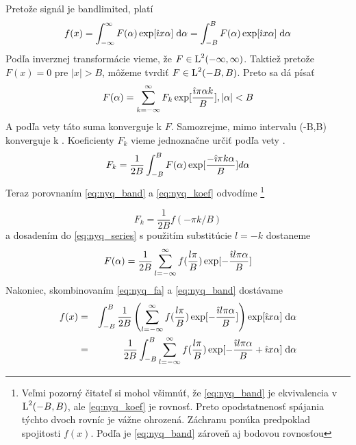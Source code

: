 \begin{dokaz}
    Pretože signál je bandlimited, platí
    \begin{equation}
        f(x) = \int_{-\infty}^{\infty} F(\alpha) \exp[ \hat{\imath} x \alpha]
        \; \mathrm{d}\alpha = \int_{-B}^{B} F(\alpha) \exp[ \hat{\imath} x \alpha]
        \; \mathrm{d}\alpha
        \label{eq:nyq_band}
    \end{equation}
    Podľa inverznej transformácie vieme, že $F \in \mbox{L}^2(-\infty,\infty)$. Taktiež
    pretože $F(x) = 0$ pre $|x| > B$, môžeme tvrdiť $F \in \mbox{L}^2(-B,B)$.
    Preto sa dá písať    
    \begin{equation}
        F(\alpha) = \sum_{k=-\infty}^{\infty} F_k \exp[\frac{\hat{\imath} \pi
        \alpha k}{B}], |\alpha|<B
        \label{eq:nyq_series}
    \end{equation}
    A podľa vety \todo{} táto suma konverguje k $F$. 
    Samozrejme, mimo intervalu (-B,B) konverguje k .
    Koeficienty $F_k$ vieme jednoznačne určiť podľa vety \todo{}.
    \begin{equation}
        F_k = \frac{1}{2B} \int_{-B}^{B} F(\alpha) \exp[\frac{- \hat{\imath}
        \pi k \alpha}{B}] d\alpha
        \label{eq:nyq_koef}
    \end{equation}
    Teraz porovnaním \ref{eq:nyq_band} a \ref{eq:nyq_koef} odvodíme        
    \footnote{Veľmi pozorný čitateľ si mohol všimnúť, že
        \ref{eq:nyq_band} je ekvivalencia v $\mbox{L}^2(-B,B)$, ale
        \ref{eq:nyq_koef} je rovnosť. Preto
        opodstatnenosť spájania týchto dvoch rovníc je vážne ohrozená.
        Záchranu ponúka predpoklad spojitosti $f(x)$. Podľa \todo{} je
        \ref{eq:nyq_band} zároveň aj bodovou rovnosťou}
    
    \begin{equation}
        F_k = \frac{1}{2B} f(- \pi k / B)
    \end{equation}
    a dosadením do \ref{eq:nyq_series} s použitím substitúcie $l=-k$ dostaneme
    \begin{equation}
        F(\alpha) = \frac{1}{2B} \sum_{l=-\infty}^{\infty}
            f(\frac{l \pi}{B}) \exp[-\frac{\hat{\imath} l \pi \alpha}{B}]
        \label{eq:nyq_fa}
    \end{equation}
    Nakoniec, skombinovaním \ref{eq:nyq_fa} a \ref{eq:nyq_band}
    dostávame
    \begin{eqnarray}
        f(x) & = & \int_{-B}^{B} \frac{1}{2B} \left(\sum_{l=-\infty}^{\infty} 
                f(\frac{l \pi}{B}) \exp[-\frac{\hat{\imath} l \pi \alpha}{B}]
                \right)
                \exp[ \hat{\imath} x \alpha] \; \mathrm{d}\alpha \\
            & = & \frac{1}{2B} \int_{-B}^{B} \sum_{l=-\infty}^{\infty} 
                f(\frac{l \pi}{B}) \exp[-\frac{\hat{\imath} l \pi \alpha}{B}
                + \hat{\imath} x \alpha] \; \mathrm{d}\alpha
    \end{eqnarray}
\end{dokaz}
